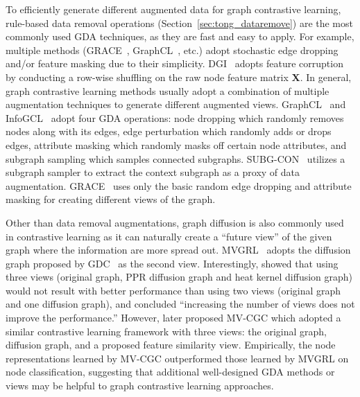 \documentclass[11pt]{article}
\begin{document}
To efficiently generate different augmented data for graph contrastive learning, rule-based data removal operations (Section~\ref{sec:tong_dataremove}) are the most commonly used GDA techniques, as they are fast and easy to apply. For example, multiple methods (GRACE~\cite{zhu2020deep}, GraphCL~\cite{you2020graph}, etc.) adopt stochastic edge dropping and/or feature masking due to their simplicity. DGI~\cite{velickovic2019deep} adopts feature corruption by conducting a row-wise shuffling on the raw node feature matrix $\mathbf{X}$. In general, graph contrastive learning methods usually adopt a combination of multiple augmentation techniques to generate different augmented views. 
GraphCL~\cite{you2020graph} and InfoGCL~\cite{xu2021infogcl} adopt four GDA operations: node dropping which randomly removes nodes along with its edges, edge perturbation which randomly adds or drops edges, attribute masking which randomly masks off certain node attributes, and subgraph sampling which samples connected subgraphs. SUBG-CON~\cite{jiao2020sub} utilizes a subgraph sampler to extract the context subgraph as a proxy of data augmentation.
GRACE~\cite{zhu2020deep} uses only the basic random edge dropping and attribute masking for creating different views of the graph. 

Other than data removal augmentations, graph diffusion is also commonly used in contrastive learning as it can naturally create a ``future view'' of the given graph where the information are more spread out. MVGRL~\cite{hassani2020contrastive} adopts the diffusion graph proposed by GDC~\cite{klicpera2019diffusion} as the second view. Interestingly, \citet{hassani2020contrastive} showed that using three views (original graph, PPR diffusion graph and heat kernel diffusion graph) would not result with better performance than using two views (original graph and one diffusion graph), and concluded ``increasing the number of views does not improve the performance.'' However, \citet{yuan2021semi} later proposed MV-CGC which adopted a similar contrastive learning framework with three views: the original graph, diffusion graph, and a proposed feature similarity view. Empirically, the node representations learned by MV-CGC outperformed those learned by MVGRL on node classification, suggesting that additional well-designed GDA methods or views may be helpful to graph contrastive learning approaches.
\end{document}
